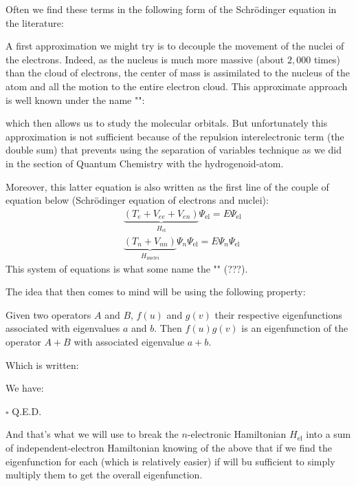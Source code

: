 	Often we find these terms in the following form of the Schrödinger equation in the literature:
	
	A first approximation we might try is to decouple the movement of the nuclei of the electrons. Indeed, as the nucleus is much more massive (about $2,000$ times) than the cloud of electrons, the center of mass is assimilated to the nucleus of the atom and all the motion to the entire electron cloud. This approximate approach is well known under the name "":
	
	which then allows us to study the molecular orbitals. But unfortunately this approximation is not sufficient because of the repulsion interelectronic term (the double sum) that prevents using the separation of variables technique as we did in the section of Quantum Chemistry with the hydrogenoid-atom.
	
	Moreover, this latter equation is also written as the first line of the couple of equation below (Schrödinger equation of electrons and nuclei):
	\begin{subequations}
		\begin{align}
		&\underbrace{(T_e+V_{ee}+V_{en})}_{H_{\text{el}}}\Psi_{\text{el}}=E\Psi_{\text{el}}\\
		&\underbrace{(T_n+V_{nn})}_{H_{\text{nuclei}}}\Psi_n\Psi_{\text{el}}=E\Psi_n\Psi_{\text{el}}
		\end{align}
	\end{subequations}
	This system of equations is what some name the "" (???).
	
	The idea that then comes to mind will be using the following property:
	
	Given two operators $A$ and $B$, $f (u)$ and $g(v)$ their respective eigenfunctions associated with eigenvalues $a$ and $b$. Then $f (u) g (v)$ is an eigenfunction of the operator $A + B$ with associated eigenvalue $a + b$.

	Which is written:
	
			
	\begin{dem}
		We have:
		
		\begin{flushright}
			$\square$  Q.E.D.
		\end{flushright}
	\end{dem}
	And that's what we will use to break the $n$-electronic Hamiltonian $H_{\text{el}}$ into a sum of independent-electron Hamiltonian knowing of the above that if we find the eigenfunction for each (which is relatively easier) if will bu sufficient to simply multiply them to get the overall eigenfunction.

